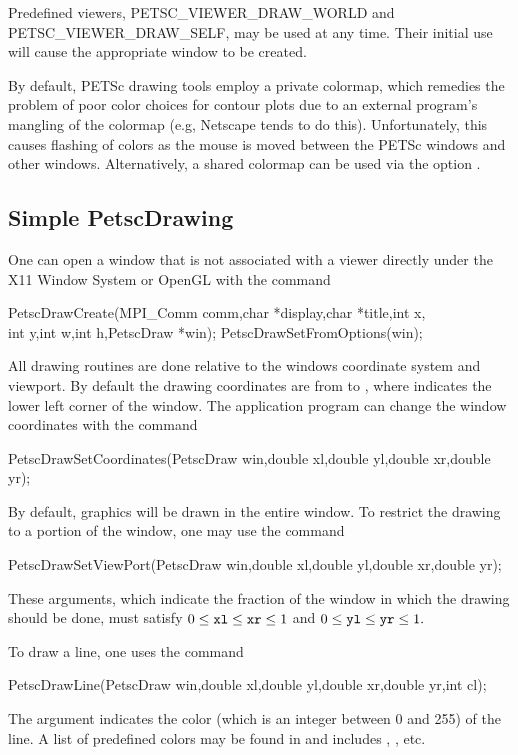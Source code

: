 {{{Predefined viewers, PETSC\_VIEWER\_DRAW\_WORLD
and PETSC\_VIEWER\_DRAW\_SELF, may be used at any time. Their initial
use will cause the appropriate window to be created.

\medskip
By default, PETSc drawing tools employ a private colormap,
which remedies the problem of poor color choices for contour plots due
to an external program's mangling of the colormap (e.g, Netscape tends
to do this).
Unfortunately, this causes flashing of colors as the mouse is moved
between the PETSc windows and other windows.  Alternatively, a shared
colormap can be used via the option .

\subsection{Simple PetscDrawing}

One can open a window that is not associated with a viewer directly
under the X11 Window System or OpenGL with the
command  
\begin{tabbing}
  PetscDrawCreate(MPI\_Comm comm,char *display,char *title,int x,\\
                 int y,int w,int h,PetscDraw *win);
  PetscDrawSetFromOptions(win);
\end{tabbing}
All drawing routines are done relative to the windows coordinate system
and viewport. By default the drawing coordinates are from  to
, where  indicates the lower left corner of the
window. The application program can change the window coordinates with the
command  
\begin{tabbing}
  PetscDrawSetCoordinates(PetscDraw win,double xl,double yl,double xr,double yr);
\end{tabbing}
By default, graphics will be drawn in the entire window. To restrict the
drawing to a portion of the window, one may
use the command
\begin{tabbing}
  PetscDrawSetViewPort(PetscDraw win,double xl,double yl,double xr,double yr);
\end{tabbing}
These arguments, which indicate the fraction of the window in which the
drawing should be done, must satisfy
$ 0 \leq {\tt xl} \leq {\tt xr} \leq 1 $ and $ 0 \leq {\tt yl} \leq {\tt yr} \leq 1.$

To draw a line, one uses
 the command 
\begin{tabbing}
  PetscDrawLine(PetscDraw win,double xl,double yl,double xr,double yr,int cl);
\end{tabbing}
The argument  indicates the color (which is an integer between 0 and 255)
of the line. A list of predefined colors may be found in 
and includes , ,  etc.

}}}
